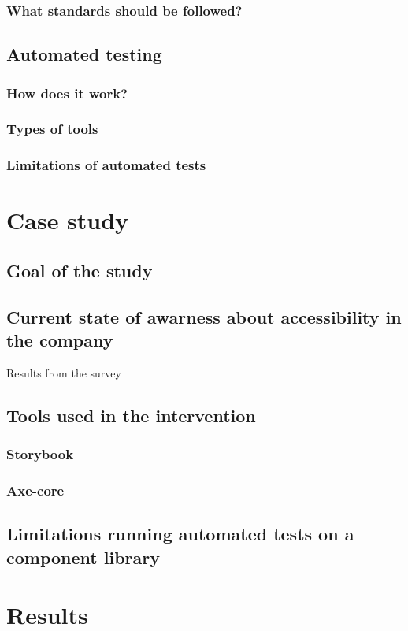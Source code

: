 \documentclass{master_thesis}
\begin{document}
		\subsubsection{What standards should be followed?}
	\subsection{Automated testing}
		\subsubsection{How does it work?}
		\subsubsection{Types of tools}
		\subsubsection{Limitations of automated tests}

\section{Case study}
% 
	\subsection{Goal of the study}
	\subsection{Current state of awarness about accessibility in the company}
	Results from the survey
	\subsection{Tools used in the intervention}
		\subsubsection{Storybook}
		\subsubsection{Axe-core}
	\subsection{Limitations running automated tests on a component library}

\section{Results}
\end{document}

